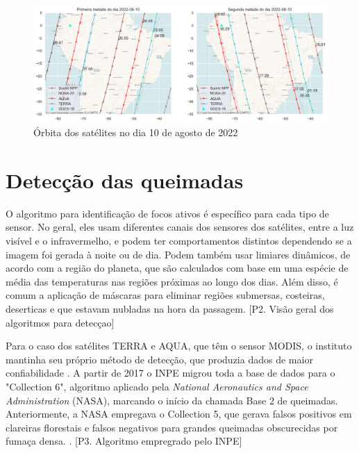 \documentclass[cic,tc]{iiufrgs}
\begin{document}
\begin{figure}
    \caption{Órbita dos satélites no dia 10 de agosto de 2022}
    \begin{center}
        \includegraphics[width=35em]{orbita2022-08-10}
    \end{center}
    \label{fig:orbita2022-08-10}
\end{figure}

\section{Detecção das queimadas}

O algoritmo para identificação de focos ativos é específico para cada tipo 
de sensor. No geral, eles usam diferentes canais dos sensores dos 
satélites, entre a luz visível e o infravermelho, e podem ter comportamentos 
distintos dependendo se a imagem foi gerada à noite ou de dia. Podem também 
usar limiares dinâmicos, de acordo com a região do planeta, que são calculados com 
base em uma espécie de média das temperaturas nas regiões próximas ao longo dos 
dias. Além disso, é comum a aplicação de máscaras para eliminar regiões submersas, 
costeiras, deserticas e que estavam nubladas na hora da passagem. 
[P2. Visão geral dos algoritmos para detecçao] \par

Para o caso dos satélites TERRA e AQUA, que têm o sensor MODIS, o 
instituto mantinha seu próprio método de detecção, que produzia dados de 
maior confiabilidade \citep{PerguntasFrequentesINPE}. 
A partir de 2017 o INPE migrou toda a base de dados para o "Collection 6", 
algoritmo aplicado pela \textit{National Aeronautics and Space Administration} 
(NASA), marcando o início da chamada Base 2 de queimadas. Anteriormente, a NASA 
empregava o Collection 5, que gerava falsos positivos em clareiras florestais e 
falsos negativos para grandes queimadas obscurecidas por fumaça densa.
\citep{SCHROEDER2008}. [P3. Algoritmo empregrado pelo INPE] \par
\end{document}

